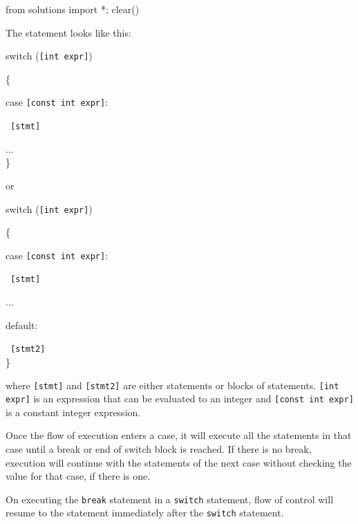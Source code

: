 \begin{python0}
from solutions import *; clear()
\end{python0}

The statement looks like this:

switch (\texttt{{[}int expr{]}})

\{

case \texttt{{[}const int expr{]}}:

\texttt{ {[}stmt{]}}

...\\
\}

or

switch (\texttt{{[}int expr{]}})

\{

case \texttt{{[}const int expr{]}}:

\texttt{ {[}stmt{]}}

...

default:

\texttt{ {[}stmt2{]}}\\
\}

where \texttt{{[}stmt{]}} and \texttt{{[}stmt2{]}} are either statements or
blocks of statements. \texttt{{[}int expr{]}} is an expression that can be
evaluated to an integer and \texttt{{[}const int expr{]}} is a constant
integer expression.

Once the flow of execution enters a case, it will execute all the
statements in that case until a break or end of switch block is reached.
If there is no break, execution will continue with the statements of the
next case without checking the value for that case, if there is one.

On executing the \texttt{break} statement in a \texttt{switch} statement,
flow of control will resume to the statement immediately after the
\texttt{switch} statement.

